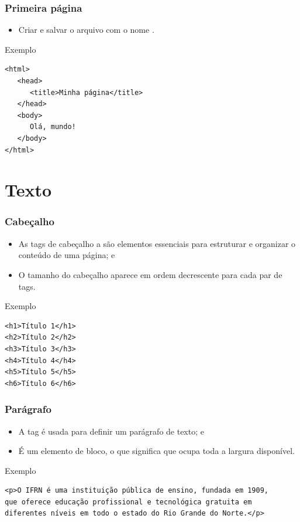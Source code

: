\documentclass[aspectratio=169]{beamer} %
\begin{document}
\begin{frame}[fragile]
	\frametitle{Primeira página}
		
	\begin{itemize}
		\item Criar e salvar o arquivo com o nome .
	\end{itemize}	
	\begin{exampleblock}{Exemplo}
		\begin{lstlisting}
<html>
   <head>
      <title>Minha página</title>
   </head>
   <body>
      Olá, mundo!
   </body>
</html>
		\end{lstlisting}
	\end{exampleblock}
\end{frame}

\section{Texto}

\begin{frame}[fragile]
	\frametitle{Cabeçalho}
	
	\begin{itemize}
		\item As tags de cabeçalho  a  são elementos essenciais para estruturar e organizar o conteúdo de uma página; e
		\item O tamanho do cabeçalho aparece em ordem decrescente para cada par de tags.
	\end{itemize}\vfill
	
	\begin{exampleblock}{Exemplo}
		\begin{lstlisting}
<h1>Título 1</h1>
<h2>Título 2</h2>
<h3>Título 3</h3>
<h4>Título 4</h4>
<h5>Título 5</h5>
<h6>Título 6</h6>
		\end{lstlisting}
	\end{exampleblock}
\end{frame}

\begin{frame}[fragile]
	\frametitle{Parágrafo}
	
	\begin{itemize}
		\item A tag  é usada para definir um parágrafo de texto; e
		\item É um elemento de bloco, o que significa que ocupa toda a largura disponível.
	\end{itemize}\vfill
	
	\begin{exampleblock}{Exemplo}
		\begin{lstlisting}
<p>O IFRN é uma instituição pública de ensino, fundada em 1909, 
que oferece educação profissional e tecnológica gratuita em 
diferentes níveis em todo o estado do Rio Grande do Norte.</p>
		\end{lstlisting}
	\end{exampleblock}
\end{frame}
\end{document}
